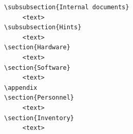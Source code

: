 \documentclass[twoside,11pt]{article}
\renewcommand{\_}{\texttt{\symbol{95}}}
\begin{document}
\begin{verbatim}
\subsubsection{Internal documents}
     <text>
\subsubsection{Hints}
     <text>
\section{Hardware}
     <text>
\section{Software}
     <text>
\appendix
\section{Personnel}
     <text>
\section{Inventory}
     <text>
\end{verbatim}

\newpage
\end{document}
